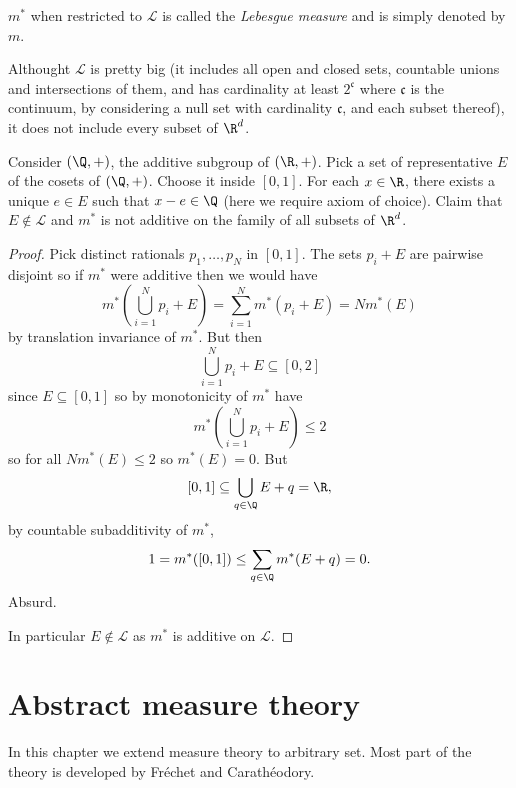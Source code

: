\documentclass[a4paper]{article}
\begin{document}
\begin{definition}
  \(m^*\) when restricted to \(\mathcal L\) is called the \emph{Lebesgue measure} and is simply denoted by \(m\).
\end{definition}

\begin{eg}
  Althought \(\mathcal L\) is pretty big (it includes all open and closed sets, countable unions and intersections of them, and has cardinality at least \(2^{\mathfrak c}\) where \(\mathfrak c\) is the continuum, by considering a null set with cardinality \(\mathfrak c\), and each subset thereof), it does not include every subset of \(\R^d\).
  
  Consider \((\Q, +)\), the additive subgroup of \((\R, +)\). Pick a set of representative \(E\) of the cosets of \((\Q, +)\). Choose it inside \([0, 1]\). For each \(x \in \R\), there exists a unique \(e \in E\) such that \(x - e \in \Q\) (here we require axiom of choice). Claim that \(E \notin \mathcal L\) and \(m^*\) is not additive on the family of all subsets of \(\R^d\).

  \begin{proof}
    Pick distinct rationals \(p_1, \dots, p_N\) in \([0, 1]\). The sets \(p_i + E\) are pairwise disjoint so if \(m^*\) were additive then we would have
    \[
      m^*(\bigcup_{i = 1}^N p_i + E)
      = \sum_{i = 1}^N m^*(p_i + E)
      = N m^*(E)
    \]
    by translation invariance of \(m^*\). But then
    \[
      \bigcup_{i = 1}^N p_i + E \subseteq [0, 2]
    \]
    since \(E \subseteq [0, 1]\) so by monotonicity of \(m^*\) have
    \[
      m^*(\bigcup_{i = 1}^N p_i + E) \leq 2
    \]
    so for all \(N m^*(E) \leq 2\) so \(m^*(E) = 0\). But
    \[
      [0, 1] \subseteq \bigcup_{q \in \Q} E + q = \R,
    \]
    by countable subadditivity of \(m^*\),
    \[
      1 = m^*([0, 1]) \leq \sum_{q \in \Q} m^*(E + q) = 0.
    \]
    Absurd.

    In particular \(E \notin \mathcal L\) as \(m^*\) is additive on \(\mathcal L\).
  \end{proof}
\end{eg}

\section{Abstract measure theory}

In this chapter we extend measure theory to arbitrary set. Most part of the theory is developed by Fréchet and Carathéodory.
\end{document}

